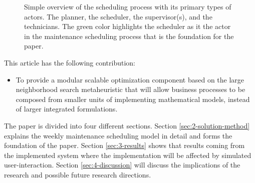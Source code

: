 \begin{figure}
	
	\caption{Simple overview of the scheduling process with its primary types of actors. The planner, the scheduler, the supervisor(s), and the technicians. 
	The green color highlights the scheduler as it the actor in the maintenance scheduling process that is the foundation for the paper.}
\end{figure}


This article has the following contribution:
\begin{itemize}
	\item To provide a modular scalable optimization component based on the large neighborhood search metaheuristic that will allow business processes to be composed from smaller units of implementing mathematical models, instead of larger integrated formulations.
\end{itemize}

The paper is divided into four different sections. Section \ref{sec:2-solution-method} explains the weekly maintenance scheduling model in detail and forms the foundation of the paper. Section \ref{sec:3-results} shows that results coming from the implemented system where the implementation will be affected by simulated user-interaction. Section \ref{sec:4-discussion} will discuss the implications of the research and possible future research directions.

